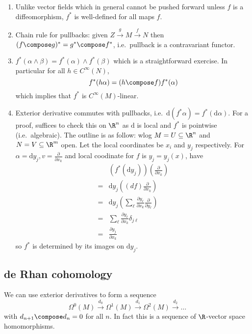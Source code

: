 \documentclass[a4paper]{article}
\newcommand{\w}{\wedge}
\begin{document}
\begin{note}\leavevmode
  \begin{enumerate}
  \item Unlike vector fields which in general cannot be pushed forward unless \(f\) is a diffeomorphism, \(f^*\) is well-defined for all maps \(f\).
  \item Chain rule for pullbacks: given \(Z \xrightarrow{g} M \xrightarrow{f} N\) then \((f \compose g)^* = g^* \compose f^*\), i.e.\ pullback is a contravariant functor.
  \item \(f^*(\alpha \w \beta) = f^*(\alpha) \w f^*(\beta)\) which is a straightforward exercise. In particular for all \(h \in C^\infty(N)\),
    \[
      f^*(h \alpha) = (h \compose f) f^*(\alpha)
    \]
    which implies that \(f^*\) is \(C^\infty(M)\)-linear.
  \item Exterior derivative commutes with pullbacks, i.e.\ \(\mathrm d (f^*\alpha) = f^*(\mathrm d \alpha)\). For a proof, suffices to check this on \(\R^n\) as \(\mathrm d\) is local and \(f^*\) is pointwise (i.e.\ algebraic). The outline is as follow: wlog \(M = U \subseteq \R^n\) and \(N = V \subseteq \R^m\) open. Let the local coordinates be \(x_i\) and \(y_j\) respectively. For \(\alpha = \mathrm dy_j, v = \frac{\partial  }{\partial x_k}\) and local coodinate for \(f\) is \(y_j = y_j(x)\), have
    \begin{align*}
      &(f^* (\mathrm d y_j)) (\frac{\partial  }{\partial x_k}) \\
      =& \mathrm d y_j ((df) \frac{\partial  }{\partial x_k}) \\
      =& \mathrm d y_j (\sum_\ell \frac{\partial y_\ell}{\partial x_k} \frac{\partial  }{\partial y_\ell}) \\
      =& \sum_\ell \frac{\partial y_\ell}{\partial x_k} \delta_{j \ell} \\
      =& \frac{\partial y_j}{\partial x_k}
    \end{align*}
    so \(f^*\) is determined by its images on \(\mathrm dy_j\).
  \end{enumerate}
\end{note}

\subsection{de Rhan cohomology}

We can use exterior derivatives to form a sequence
\[
  \Omega^0(M) \xrightarrow{d_0} \Omega^1(M) \xrightarrow{d_1} \Omega^2(M) \xrightarrow{d_2} \dots
\]
with \(d_{n + 1} \compose d_n = 0\) for all \(n\). In fact this is a sequence of \(\R\)-vector space homomorphisms.
\end{document}
